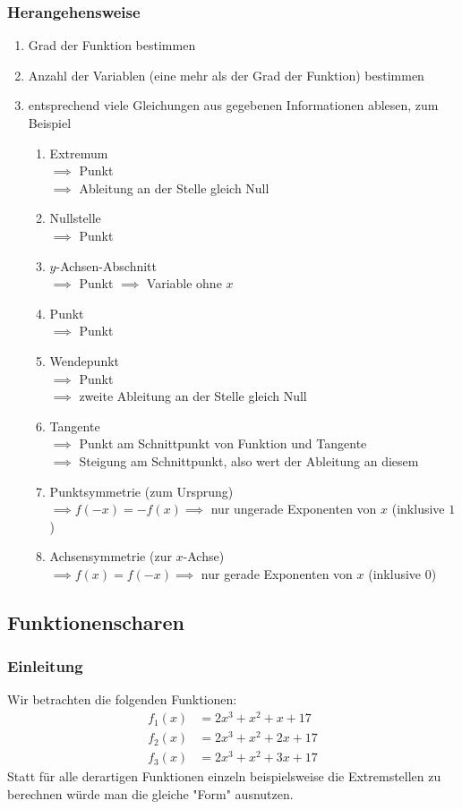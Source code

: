 \documentclass{article}
\begin{document}
  \subsubsection{Herangehensweise}
  \begin{enumerate}
  	\item Grad der Funktion bestimmen
  	\item Anzahl der Variablen (eine mehr als der Grad der Funktion) bestimmen
  	\item entsprechend viele Gleichungen aus gegebenen Informationen ablesen, zum Beispiel
  	\begin{enumerate}
  		\item Extremum \\
  		$\implies$ Punkt \\
  		$\implies$ Ableitung an der Stelle gleich Null
  		\item Nullstelle \\
  		$\implies$ Punkt
  		\item $y$-Achsen-Abschnitt \\
  		$\implies$ Punkt $\implies$ Variable ohne $x$
  		\item Punkt \\
  		$\implies$ Punkt
  		\item Wendepunkt \\
  		$\implies$ Punkt \\
  		$\implies$ zweite Ableitung an der Stelle gleich Null
  		\item Tangente \\
  		$\implies$ Punkt am Schnittpunkt von Funktion und Tangente \\
  		$\implies$ Steigung am Schnittpunkt, also wert der Ableitung an diesem 
  		\item Punktsymmetrie (zum Ursprung) \\
  		$\implies f(-x) = -f(x) \implies$ nur ungerade Exponenten von $x$ (inklusive $1$)
  		\item Achsensymmetrie (zur $x$-Achse) \\
  		$\implies f(x) = f(-x) \implies$ nur gerade Exponenten von $x$ (inklusive $0$)
  	\end{enumerate}
  \end{enumerate}
  
  \subsection{Funktionenscharen}
  
  \subsubsection{Einleitung}
  Wir betrachten die folgenden Funktionen: 
  \begin{align*}
  	f_1(x) &= 2x^3 + x^2 + x + 17 \\
  	f_2(x) &= 2x^3 + x^2 + 2x + 17 \\
  	f_3(x) &= 2x^3 + x^2 + 3x + 17
  \end{align*}
  Statt für alle derartigen Funktionen einzeln beispielsweise die Extremstellen zu berechnen würde man die gleiche "Form" ausnutzen. 
  
\end{document}
